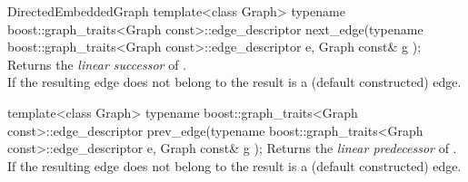 \begin{ccRefConcept}{DirectedEmbeddedGraph}
  \ccFunction
  {template<class Graph>
  typename boost::graph_traits<Graph const>::edge_descriptor 
  next_edge(typename boost::graph_traits<Graph const>::edge_descriptor e, Graph const& g );
  }
  {Returns the {\em linear successor} of .\\
  If the resulting edge does not belong to  the result is a  (default constructed) edge. }
  
  \ccFunction
  {template<class Graph>
  typename boost::graph_traits<Graph const>::edge_descriptor 
  prev_edge(typename boost::graph_traits<Graph const>::edge_descriptor e, Graph const& g );
  }
  {Returns the {\em linear predecessor} of .\\
  If the resulting edge does not belong to  the result is a  (default constructed) edge. }

\ccHasModels
{}\\

\end{ccRefConcept}

